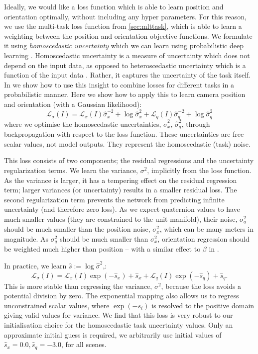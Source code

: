 Ideally, we would like a loss function which is able to learn position and orientation optimally, without including any hyper parameters. For this reason, we use the multi-task loss function from \cref{sec:mlttask}, which is able to learn a weighting between the position and orientation objective functions. We formulate it using \textit{homoscedastic uncertainty} which we can learn using probabilistic deep learning \citep{kendall2017uncertainties}. Homoscedastic uncertainty is a measure of uncertainty which does not depend on the input data, as opposed to heteroscedastic uncertainty which is a function of the input data \citep{kendall2017uncertainties}. Rather, it captures the uncertainty of the task itself. In \citep{kendall2017multi} we show how to use this insight to combine losses for different tasks in a probabilistic manner. Here we show how to apply this to learn camera position and orientation (with a Gaussian likelihood):
\begin{equation}
\label{eqn:loss4}
\mathcal{L}_{\sigma}(I) = \mathcal{L}_x(I) \hat{\sigma}_x^{-2} + \log{\hat{\sigma}_x^2} + \mathcal{L}_{q}(I) \hat{\sigma}_q^{-2} + \log{\hat{\sigma}_q^2}
\end{equation}
where we optimise the homoscedastic uncertainties, $\hat{\sigma}_x^2$, $\hat{\sigma}_q^2$, through backpropagation with respect to the loss function. These uncertainties are free scalar values, not model outputs. They represent the homoscedastic (task) noise.

This loss consists of two components; the residual regressions and the uncertainty regularization terms. We learn the variance, $\sigma^2$, implicitly from the loss function. As the variance is larger, it has a tempering effect on the residual regression term; larger variances (or uncertainty) results in a smaller residual loss. The second regularization term prevents the network from predicting infinite uncertainty (and therefore zero loss). As we expect quaternion values to have much smaller values (they are constrained to the unit manifold), their noise, $\sigma_q^2$ should be much smaller than the position noise, $\sigma_x^2$, which can be many meters in magnitude. As $\sigma_q^2$ should be much smaller than $\sigma_x^2$, orientation regression should be weighted much higher than position -- with a similar effect to $\beta$ in .

In practice, we learn $\hat{s}:=\log\hat{\sigma}^2$,:
\begin{equation}
\label{eqn:loss5}
\mathcal{L}_{\sigma}(I) = \mathcal{L}_x(I) \exp (-\hat{s}_x) + \hat{s}_x + \mathcal{L}_{q}(I) \exp (-\hat{s}_q) + \hat{s}_q.
\end{equation}
This is more stable than regressing the variance, $\sigma^2$, because the loss avoids a potential division by zero. The exponential mapping also allows us to regress unconstrained scalar values, where $\exp(-s_i)$ is resolved to the positive domain giving valid values for variance. We find that this loss is very robust to our initialisation choice for the homoscedastic task uncertainty values. Only an approximate initial guess is required, we arbitrarily use initial values of $\hat{s}_x=0.0, \hat{s}_q=-3.0$, for all scenes.

